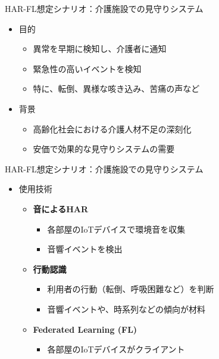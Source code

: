 \documentclass[unicode,12pt,aspectratio=169,dvipdfmx]{beamer}
\begin{document}
\begin{frame}{HAR-FL想定シナリオ：介護施設での見守りシステム}
    \begin{itemize}
        \item 目的
        \begin{itemize}
            \item 異常を早期に検知し、介護者に通知
            \item 緊急性の高いイベントを検知
            \item 特に、転倒、異様な咳き込み、苦痛の声など
        \end{itemize}
        \item 背景
        \begin{itemize}
            \item 高齢化社会における介護人材不足の深刻化
            \item 安価で効果的な見守りシステムの需要
        \end{itemize}
    \end{itemize}
\end{frame}

\begin{frame}{HAR-FL想定シナリオ：介護施設での見守りシステム}
    \begin{itemize}
        \item 使用技術
        \begin{itemize}
            \item \textbf{音によるHAR}
            \begin{itemize}
                \item 各部屋のIoTデバイスで環境音を収集
                \item 音響イベントを検出
            \end{itemize}
            \item \textbf{行動認識}
            \begin{itemize}
                \item 利用者の行動（転倒、呼吸困難など）を判断
                \item 音響イベントや、時系列などの傾向が材料
            \end{itemize}
            \item \textbf{Federated Learning (FL)}
            \begin{itemize}
                \item 各部屋のIoTデバイスがクライアント
            \end{itemize}
        \end{itemize}
    \end{itemize}
\end{frame}
\end{document}

